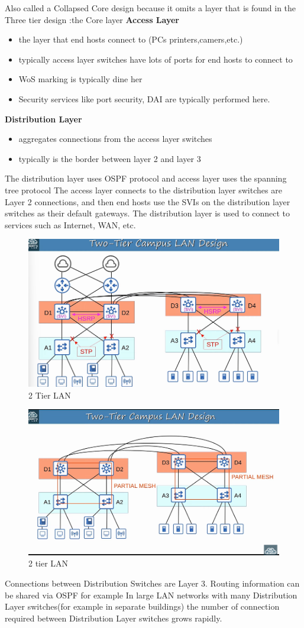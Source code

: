 \documentclass{report}
\begin{document}
	Also called a Collapsed Core design because it omits a layer that is found in the
	Three tier design :the Core layer \textbf{Access Layer}
	\begin{itemize}
		\item the layer that end hosts connect to (PCs printers,camers,etc.)

		\item typically access layer switches have lots of ports for end hosts to connect
			to

		\item WoS marking is typically dine her

		\item Security services like port security, DAI are typically performed here.
	\end{itemize}

	\textbf{Distribution Layer}
	\begin{itemize}
		\item aggregates connections from the access layer switches

		\item typically is the border between layer 2 and layer 3
	\end{itemize}
	The distribution layer uses OSPF protocol and access layer uses the spanning tree
	protocol The access layer connects to the distribution layer switches are Layer
	2 connections, and then end hosts use the SVIs on the distribution layer
	switches as their default gateways. The distribution layer is used to connect to
	services such as Internet, WAN, etc.

	\begin{figure}
		\centering
		\includegraphics[width=0.5\linewidth]{image.png}
		\caption{2 Tier LAN}
		\label{fig:enter-label}
	\end{figure}
	\begin{figure}
		\centering
		\includegraphics[width=0.5\linewidth]{2tier.png}
		\caption{2 tier LAN}
		\label{fig:enter-label}
	\end{figure}
	Connections between Distribution Switches are Layer 3. Routing information can
	be shared via OSPF for example In large LAN networks with many Distribution Layer
	switches(for example in separate buildings) the number of connection required
	between Distribution Layer switches grows rapidly.
\end{document}

